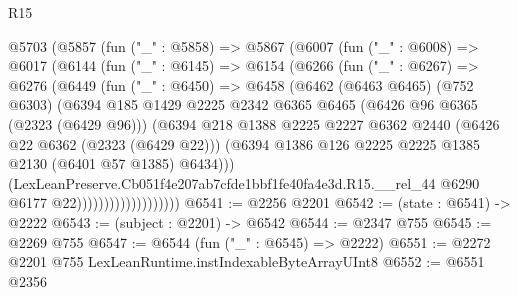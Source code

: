 \begin{lexlean}{R15}
\begin{coremodule}
                @5703
                  (@5857
                    (fun ("_" : @5858) =>
                    @5867
                      (@6007
                        (fun ("_" : @6008) =>
                        @6017
                          (@6144
                            (fun ("_" : @6145) =>
                            @6154
                              (@6266
                                (fun ("_" : @6267) =>
                                @6276
                                  (@6449
                                    (fun ("_" : @6450) =>
                                    @6458
                                      (@6462
                                        (@6463 @6465)
                                        (@752 @6303)
                                        (@6394
                                          @185
                                          @1429
                                          @2225
                                          @2342
                                          @6365
                                          @6465
                                          (@6426 @96 @6365 (@2323 (@6429 @96)))
                                          (@6394
                                            @218
                                            @1388
                                            @2225
                                            @2227
                                            @6362
                                            @2440
                                            (@6426 @22 @6362 (@2323 (@6429 @22)))
                                            (@6394
                                              @1386
                                              @126
                                              @2225
                                              @2225
                                              @1385
                                              @2130
                                              (@6401 @57 @1385)
                                              @6434)))
                                        (LexLeanPreserve.Cb051f4e207ab7cfde1bbf1fe40fa4e3d.R15.__rel_44
                                          @6290
                                          @6177
                                          @22)))))))))))))))))))
@6541 := @2256 @2201
@6542 := (state : @6541) -> @2222
@6543 := (subject : @2201) -> @6542
@6544 := @2347 @755
@6545 := @2269 @755
@6547 := @6544 (fun ("_" : @6545) => @2222)
@6551 := @2272 @2201 @755 LexLeanRuntime.instIndexableByteArrayUInt8
@6552 := @6551 @2356

\end{coremodule}
\end{lexlean}
